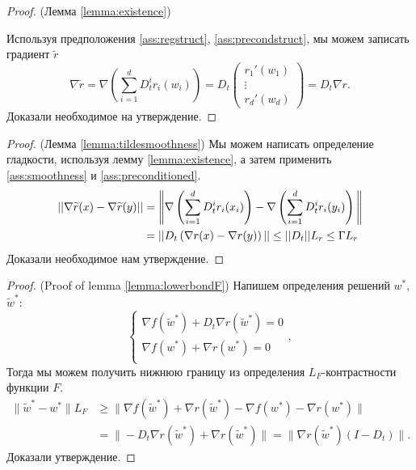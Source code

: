 \begin{proof} (Лемма \ref{lemma:existence})

Используя предположения \ref{ass:regstruct}, \ref{ass:precondstruct}, мы можем записать градиент $\widetilde{r}$
\begin{equation*}
\nabla \widetilde{r} = \nabla \left( \sum_{i=1}^d D_t^i r_i(w_i) \right) = D_t \begin{pmatrix}
  r_1'(w_1) \\
  \vdots  \\
  r_d'(w_d)
\end{pmatrix} = D_t \nabla r.
\end{equation*}
Доказали необходимое на утверждение.
\end{proof}

\begin{proof} (Лемма \ref{lemma:tildesmoothness})
Мы можем написать определение гладкости, используя лемму \ref{lemma:existence}, а затем применить \ref{ass:smoothness} и \ref{ass:preconditioned}.
\begin{equation*}
\begin{split}
    || \nabla \widetilde{r}(x) - \nabla \widetilde{r}(y) || &=
    \Bigg{\|} \nabla \left( \sum_{i=1}^d D_t^i r_i(x_i) \right) - \nabla \left( \sum_{i=1}^d D_t^i r_i(y_i) \right) \Bigg{\|} \\
    & = ||D_t \left( \nabla r(x) - \nabla r(y) \right)|| \le  ||D_t|| L_r \le \Gamma L_r
\end{split}
\end{equation*}
Доказали необходимое нам утверждение.
\end{proof}

\begin{proof} (Proof of lemma \ref{lemma:lowerbondF})
    Напишем определения решений $w^*$, $\widetilde{w}^*$:
        \begin{equation*}
        \begin{cases}
            \nabla f (\widetilde{w}^*) + D_t \nabla r(\widetilde{w}^*) = 0\\
            \nabla f (w^*) + \nabla r(w^*) = 0\\
        \end{cases},
        \end{equation*}
        Тогда мы можем получить нижнюю границу из определения $L_F$-контрастности функции $F$.
        \begin{equation*}
        \begin{split}
        \|\widetilde{w}^* - w^* \| L_F &\geq \| \nabla f (\widetilde{w}^*) + \nabla r(\widetilde{w}^*) - \nabla f (w^*) - \nabla r (w^*) \| \\
        &= \| - D_t \nabla r (\widetilde{w}^*) + \nabla r(\widetilde{w}^*) \|  = \| \nabla r (\widetilde{w}^*) (I - D_t)\|.
        \end{split}
        \end{equation*}
    Доказали утверждение.
\end{proof}

